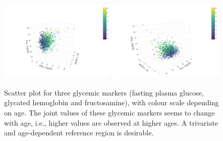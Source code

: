 \begin{figure}[!htb]
	\centering
	\includegraphics[width=0.49\textwidth]{Fig5.1.png}
	\includegraphics[width=0.49\textwidth]{Fig5.2.png}
	\caption{Scatter plot for three glycemic markers (fasting plasma glucose, glycated hemoglobin and fructosamine), with colour scale depending on age. The joint values of these glycemic markers seems to change with age, i.e., higher values are observed at higher ages. A trivariate and age-dependent reference region is desirable.}
	\label{3d}
\end{figure}

